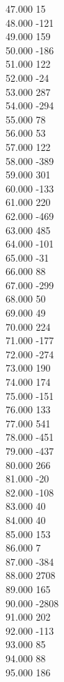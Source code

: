 { 47.000	15 \\
 48.000	-121 \\
 49.000	159 \\
 50.000	-186 \\
 51.000	122 \\
 52.000	-24 \\
 53.000	287 \\
 54.000	-294 \\
 55.000	78 \\
 56.000	53 \\
 57.000	122 \\
 58.000	-389 \\
 59.000	301 \\
 60.000	-133 \\
 61.000	220 \\
 62.000	-469 \\
 63.000	485 \\
 64.000	-101 \\
 65.000	-31 \\
 66.000	88 \\
 67.000	-299 \\
 68.000	50 \\
 69.000	49 \\
 70.000	224 \\
 71.000	-177 \\
 72.000	-274 \\
 73.000	190 \\
 74.000	174 \\
 75.000	-151 \\
 76.000	133 \\
 77.000	541 \\
 78.000	-451 \\
 79.000	-437 \\
 80.000	266 \\
 81.000	-20 \\
 82.000	-108 \\
 83.000	40 \\
 84.000	40 \\
 85.000	153 \\
 86.000	7 \\
 87.000	-384 \\
 88.000	2708 \\
 89.000	165 \\
 90.000	-2808 \\
 91.000	202 \\
 92.000	-113 \\
 93.000	85 \\
 94.000	88 \\
 95.000	186 \\
}
